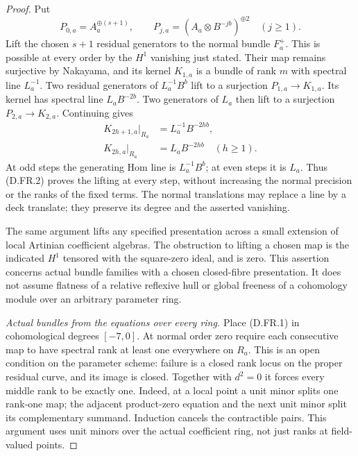 \begin{proof}
Put
\[
 P_{0,a}=A_a^{\oplus(s+1)},\qquad
 P_{j,a}=(A_a\otimes B^{-jb})^{\oplus2}\quad(j\geq1).
                                                        \tag{D.FR.3}
\]
Lift the chosen $s+1$ residual generators to the normal
bundle $F_a^+$. This is possible at every order by the
$H^1$ vanishing just stated. Their map remains surjective
by Nakayama, and its kernel $K_{1,a}$ is a bundle of rank
$m$ with spectral line $L_a^{-1}$. Two residual generators
of $L_a^{-1}B^b$ lift to a surjection
$P_{1,a}\to K_{1,a}$. Its kernel has spectral line
$L_aB^{-2b}$. Two generators of $L_a$ then lift to a
surjection $P_{2,a}\to K_{2,a}$. Continuing gives
\[
 \begin{split}
 K_{2h+1,a}|_{R_a}&=L_a^{-1}B^{-2hb},\\
 K_{2h,a}|_{R_a}&=L_aB^{-2hb}\quad(h\geq1).
 \end{split}                                            \tag{D.FR.4}
\]
At odd steps the generating Hom line is
$L_a^{-1}B^b$; at even steps it is $L_a$. Thus (D.FR.2)
proves the lifting at every step, without increasing the
normal precision or the ranks of the fixed terms. The
normal translations may replace a line by a deck translate;
they preserve its degree and the asserted vanishing.

The same argument lifts any specified presentation across
a small extension of local Artinian coefficient algebras.
The obstruction to lifting a chosen map is the indicated
$H^1$ tensored with the square-zero ideal, and is zero.
This assertion concerns actual bundle families with a
chosen closed-fibre presentation. It does not assume
flatness of a relative reflexive hull or global freeness
of a cohomology module over an arbitrary parameter ring.

\emph{Actual bundles from the equations over every ring.}
Place (D.FR.1) in cohomological degrees $[-7,0]$.
At normal order zero require each consecutive map to
have spectral rank at least one everywhere on $R_a$.
This is an open condition on the parameter scheme:
failure is a closed rank locus on the proper residual
curve, and its image is closed. Together with $d^2=0$
it forces every middle rank to be exactly one. Indeed,
at a local point a unit minor splits one rank-one map;
the adjacent product-zero equation and the next unit
minor split its complementary summand. Induction
cancels the contractible pairs. This argument uses unit
minors over the actual coefficient ring, not just ranks
at field-valued points.


\end{proof}
